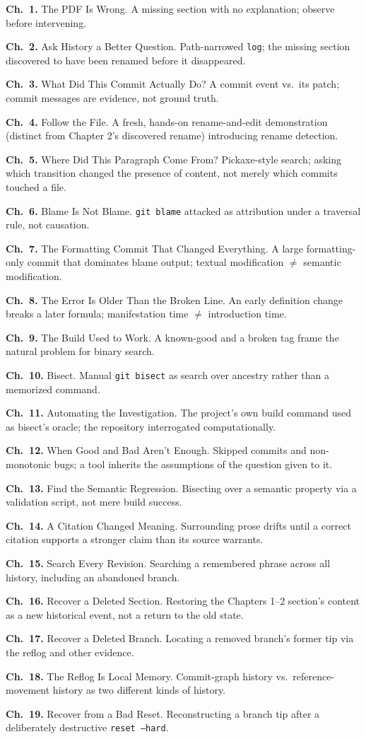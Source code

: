 \documentclass[11pt]{book}
\newcommand{\subheading}[1]{\bigskip\noindent{\bfseries\itshape #1}\smallskip\par}
\newcommand{\chapentry}[2]{\noindent\textbf{Ch.~#1.} #2\par\smallskip}
\begin{document}
\subheading{Chapter Outline}
\chapentry{1}{The PDF Is Wrong. A missing section with no explanation; observe before intervening.}
\chapentry{2}{Ask History a Better Question. Path-narrowed \texttt{log}; the missing section discovered to have been renamed before it disappeared.}
\chapentry{3}{What Did This Commit Actually Do? A commit event vs.\ its patch; commit messages are evidence, not ground truth.}
\chapentry{4}{Follow the File. A fresh, hands-on rename-and-edit demonstration (distinct from Chapter 2's discovered rename) introducing rename detection.}
\chapentry{5}{Where Did This Paragraph Come From? Pickaxe-style search; asking which transition changed the presence of content, not merely which commits touched a file.}
\chapentry{6}{Blame Is Not Blame. \texttt{git blame} attacked as attribution under a traversal rule, not causation.}
\chapentry{7}{The Formatting Commit That Changed Everything. A large formatting-only commit that dominates blame output; textual modification $\neq$ semantic modification.}
\chapentry{8}{The Error Is Older Than the Broken Line. An early definition change breaks a later formula; manifestation time $\neq$ introduction time.}
\chapentry{9}{The Build Used to Work. A known-good and a broken tag frame the natural problem for binary search.}
\chapentry{10}{Bisect. Manual \texttt{git bisect} as search over ancestry rather than a memorized command.}
\chapentry{11}{Automating the Investigation. The project's own build command used as bisect's oracle; the repository interrogated computationally.}
\chapentry{12}{When Good and Bad Aren't Enough. Skipped commits and non-monotonic bugs; a tool inherits the assumptions of the question given to it.}
\chapentry{13}{Find the Semantic Regression. Bisecting over a semantic property via a validation script, not mere build success.}
\chapentry{14}{A Citation Changed Meaning. Surrounding prose drifts until a correct citation supports a stronger claim than its source warrants.}
\chapentry{15}{Search Every Revision. Searching a remembered phrase across all history, including an abandoned branch.}
\chapentry{16}{Recover a Deleted Section. Restoring the Chapters 1--2 section's content as a new historical event, not a return to the old state.}
\chapentry{17}{Recover a Deleted Branch. Locating a removed branch's former tip via the reflog and other evidence.}
\chapentry{18}{The Reflog Is Local Memory. Commit-graph history vs.\ reference-movement history as two different kinds of history.}
\chapentry{19}{Recover from a Bad Reset. Reconstructing a branch tip after a deliberately destructive \texttt{reset --hard}.}
\end{document}
